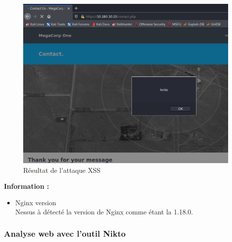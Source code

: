 \documentclass[french,paper=a4,oneside,captions=tableheading]{article}
\begin{document}
\begin{itemize}
\begin{figure}[H]
    \centering
    \includegraphics[width=0.75\linewidth]{images/xssattacks-2.png}
    \caption{Résultat de l'attaque XSS}
    \label{fig:xssattacks-2}
\end{figure}


\end{itemize}

\textbf{Information :}\\
\begin{itemize}
    \item Nginx version\\
Nessus à détecté la version de Nginx comme étant la 1.18.0. \\
\end{itemize}



\subsubsection{Analyse web avec l'outil Nikto}
\end{document}
